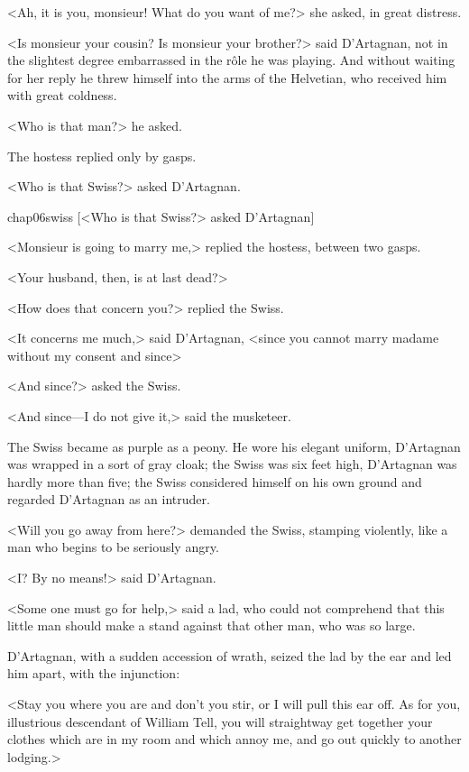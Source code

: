 <Ah, it is you, monsieur! What do you want of me?> she asked, in great distress.

<Is monsieur your cousin? Is monsieur your brother?> said D'Artagnan, not in the slightest degree embarrassed in the rôle he was playing. And without waiting for her reply he threw himself into the arms of the Helvetian, who received him with great coldness.

<Who is that man?> he asked.

The hostess replied only by gasps.

<Who is that Swiss?> asked D'Artagnan.


\begin{colorbigpic}
	[\basicscale] 
	{chap06swiss}
	[<Who is that Swiss?> asked D'Artagnan]
\end{colorbigpic}


<Monsieur is going to marry me,> replied the hostess, between two gasps.

<Your husband, then, is at last dead?>

<How does that concern you?> replied the Swiss.

<It concerns me much,> said D'Artagnan, <since you cannot marry madame without my consent and since\longdash>

<And since?> asked the Swiss.

<And since—I do not give it,> said the musketeer.

The Swiss became as purple as a peony. He wore his elegant uniform, D'Artagnan was wrapped in a sort of gray cloak; the Swiss was six feet high, D'Artagnan was hardly more than five; the Swiss considered himself on his own ground and regarded D'Artagnan as an intruder.

<Will you go away from here?> demanded the Swiss, stamping violently, like a man who begins to be seriously angry.

<I? By no means!> said D'Artagnan.

<Some one must go for help,> said a lad, who could not comprehend that this little man should make a stand against that other man, who was so large.

D'Artagnan, with a sudden accession of wrath, seized the lad by the ear and led him apart, with the injunction:

<Stay you where you are and don't you stir, or I will pull this ear off. As for you, illustrious descendant of William Tell, you will straightway get together your clothes which are in my room and which annoy me, and go out quickly to another lodging.>

